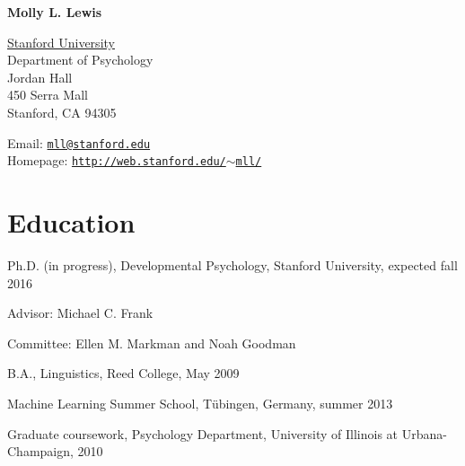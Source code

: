 \documentclass[letterpaper]{article}
\def\name{Molly L.  Lewis}
\renewenvironment{itemize}{
  \begin{list}{}{
    \setlength{\leftmargin}{1.5em}
  }
}{
  \end{list}
}
\begin{document}
\centerline{\huge \bf \name}
\vspace{0.25in}


 \normalsize
  \href{http://www.stanford.edu/}{Stanford University} \\
  Department of Psychology \\
  Jordan Hall\\
  450 Serra Mall \\
  Stanford, CA 94305\\
  
  \begin{minipage}{0.45\linewidth}
Email: \href{mailto:mll@stanford.edu}{\tt mll@stanford.edu}\\
Homepage: \href{http://web.stanford.edu/~mll/}{\tt http://web.stanford.edu/$\sim$mll/}\\
 
\end{minipage}


\section*{Education}

\begin{itemize}
  \item Ph.D. (in progress), Developmental Psychology, Stanford University, expected fall 2016
  \begin{itemize}
  	\item Advisor: Michael C. Frank
	\item Committee: Ellen M. Markman and Noah Goodman
   \end{itemize}
  \item B.A., Linguistics, Reed College, May 2009
   \item Machine Learning Summer School, T\"{u}bingen, Germany, summer 2013 
   \item Graduate coursework, Psychology Department, University of Illinois at Urbana-Champaign, 2010
\end{itemize}
\end{document}
